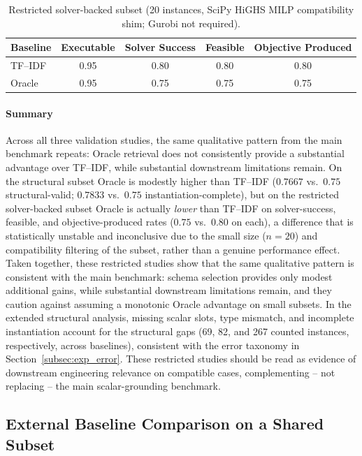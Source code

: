 \documentclass[pdflatex,sn-basic,Numbered]{sn-jnl}
\begin{document}
\begin{table}[t]
\centering
\caption{Restricted solver-backed subset (20 instances, SciPy HiGHS MILP compatibility shim; Gurobi not required).}
\label{tab:eng-solver}
\small
\begin{tabular}{lcccc}
  \toprule
  Baseline & Executable & Solver Success & Feasible & Objective Produced \\
  \midrule
  TF--IDF & 0.95 & 0.80 & 0.80 & 0.80 \\
  Oracle  & 0.95 & 0.75 & 0.75 & 0.75 \\
  \bottomrule
\end{tabular}
\end{table}

\paragraph{Summary} Across all three validation studies, the same qualitative pattern from the main benchmark repeats: Oracle retrieval does not consistently provide a substantial advantage over TF--IDF, while substantial downstream limitations remain. On the structural subset Oracle is modestly higher than TF--IDF ($0.7667$ vs.\ $0.75$ structural-valid; $0.7833$ vs.\ $0.75$ instantiation-complete), but on the restricted solver-backed subset Oracle is actually \emph{lower} than TF--IDF on solver-success, feasible, and objective-produced rates ($0.75$ vs.\ $0.80$ on each), a difference that is statistically unstable and inconclusive due to the small size ($n=20$) and compatibility filtering of the subset, rather than a genuine performance effect. Taken together, these restricted studies show that the same qualitative pattern is consistent with the main benchmark: schema selection provides only modest additional gains, while substantial downstream limitations remain, and they caution against assuming a monotonic Oracle advantage on small subsets. In the extended structural analysis, missing scalar slots, type mismatch, and incomplete instantiation account for the structural gaps (69, 82, and 267 counted instances, respectively, across baselines), consistent with the error taxonomy in Section~\ref{subsec:exp_error}. These restricted studies should be read as evidence of downstream engineering relevance on compatible cases, complementing -- not replacing -- the main scalar-grounding benchmark.

\subsection{External Baseline Comparison on a Shared Subset}
\label{subsec:exp_external}
\end{document}
